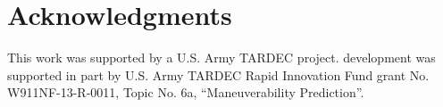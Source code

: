 \section*{Acknowledgments}
This work was supported by a U.S. Army TARDEC project. \chrono{} development was supported in part by U.S. Army TARDEC Rapid Innovation Fund grant No. W911NF-13-R-0011, Topic No. 6a, ``Maneuverability Prediction''. 











